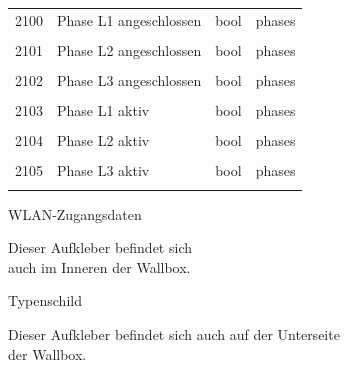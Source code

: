 \documentclass[a4paper,10pt]{article}
\newcommand{\tdesc}[1]{\multicolumn{3}{l}{\footnotesize #1}}
\begin{document}
\begin{tabularx}{\textwidth}{rXll}
2100          & Phase L1 angeschlossen                  & bool         & phases                                                 \\
              & \tdesc{}                                                                                                        \\ \cmidrule{2-4}
2101          & Phase L2 angeschlossen                  & bool         & phases                                                 \\
              & \tdesc{}                                                                                                        \\ \cmidrule{2-4}
2102          & Phase L3 angeschlossen                  & bool         & phases                                                 \\
              & \tdesc{}                                                                                                        \\ \cmidrule{2-4}
2103          & Phase L1 aktiv                          & bool         & phases                                                 \\
              & \tdesc{}                                                                                                        \\ \cmidrule{2-4}
2104          & Phase L2 aktiv                          & bool         & phases                                                 \\
              & \tdesc{}                                                                                                        \\ \cmidrule{2-4}
2105          & Phase L3 aktiv                          & bool         & phases                                                 \\
              & \tdesc{}                                                                                                        \\ \bottomrule
   \end{tabularx}
	\begin{multicols*}{2}




	\newpage
	\pagestyle{empty}
	\null
	\vfill
	WLAN-Zugangsdaten
	\begin{tcolorbox}[width=4.2cm,height=2.7cm, boxrule=0.25mm]

	\end{tcolorbox}
	Dieser Aufkleber befindet sich\\ auch im Inneren der Wallbox.
	\columnbreak

	\null
	\vfill
	Typenschild
	\begin{tcolorbox}[width=7.8cm,height=4.1cm, boxrule=0.25mm]

	\end{tcolorbox}
	Dieser Aufkleber befindet sich auch auf der Unterseite\\ der Wallbox.
\end{multicols*}
\end{document}
